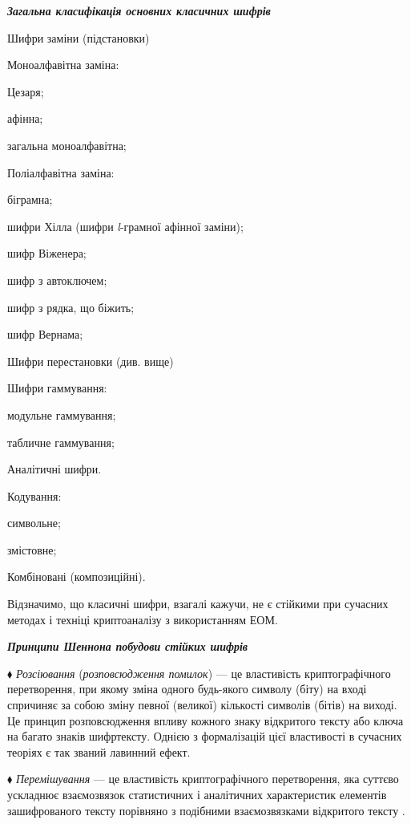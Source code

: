 \bigskip

{\centering\bfseries\itshape
Загальна класифікація основних класичних  шифрів
\par}


\bigskip

Шифри заміни (підстановки)

Моноалфавітна заміна:

Цезаря;

афінна;

загальна моноалфавітна;

Поліалфавітна заміна:

біграмна;

шифри Хілла (шифри \textit{l}{}-грамної афінної заміни);

шифр Віженера;

шифр з автоключем;

шифр з рядка, що біжить;

шифр Вернама;

Шифри перестановки (див. вище)

Шифри гаммування:

модульне гаммування;

табличне гаммування;


\bigskip

Аналітичні шифри.

Кодування:

символьне;

змістовне;

Комбіновані (композиційні).

Відзначимо,  що класичні  шифри, взагалі кажучи, не є стійкими при сучасних
методах і техніці криптоаналізу з використанням ЕОМ.


\bigskip

{\centering\bfseries\itshape
Принципи Шеннона побудови стійких  шифрів
\par}


\bigskip


\bigskip

${\blacklozenge}$ \textit{Розсіювання} (\textit{розповсюдження помилок}) --- це
властивість криптографічного перетворення, при якому зміна одного будь-якого 
символу (біту) на вході спричиняє за собою зміну певної (великої)  кількості
символів (бітів) на виході. Це принцип розповсюдження впливу кожного знаку 
відкритого тексту або ключа на багато знаків шифртексту. Однією з формалізацій
цієї властивості  в сучасних теоріях є так званий лавинний ефект.

${\blacklozenge}$ \textit{Перемішування }--- це властивість криптографічного
перетворення, яка суттєво ускладнює взаємозв{\textquotesingle}язок статистичних
 і аналітичних характеристик елементів зашифрованого тексту порівняно з
подібними взаємозв{\textquotesingle}язками відкритого тексту . 

